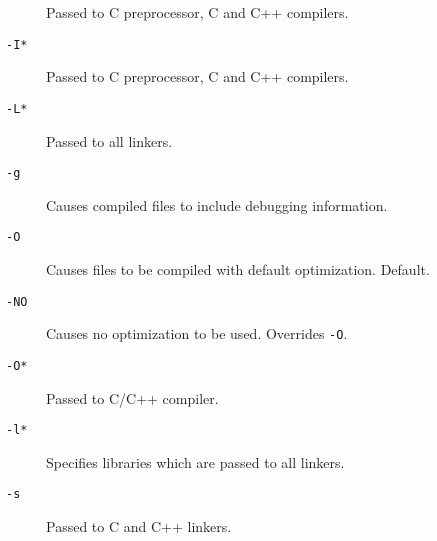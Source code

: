 \begin{description}
Passed to C preprocessor, C and C++ compilers.

\item[{\tt -I*}]

Passed to C preprocessor, C and C++ compilers.

\item[{\tt -L*}]

Passed to all linkers.

\item[{\tt -g}]

Causes compiled files to include debugging information.

\item[{\tt -O}]

Causes files to be compiled with default optimization.  Default.

\item[{\tt -NO}]

Causes no optimization to be used.  Overrides {\tt -O}.

\item[{\tt -O*}]

Passed to C/C++ compiler.

\item[{\tt -l*}]

Specifies libraries which are passed to all linkers.

\item[{\tt -s}]

Passed to C and C++ linkers.

\end{description}



